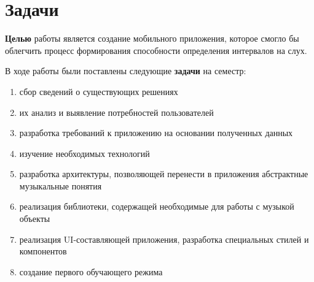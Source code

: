 \titleformat{\chapter}[display]
  {\normalfont\bfseries}{}{0pt}{\Huge}
\chapter{Задачи}

\textbf{Целью} работы является создание мобильного приложения, которое смогло бы облегчить процесс формирования способности определения интервалов на слух. \medskip\par
В ходе работы были поставлены следующие \textbf{задачи} на семестр:
\begin{enumerate}
\item сбор сведений о существующих решениях
\item их анализ и выявление потребностей пользователей
\item разработка требований к приложению на основании полученных данных
\item изучение необходимых технологий
\item разработка архитектуры, позволяющей перенести в приложения абстрактные музыкальные понятия
\item реализация библиотеки, содержащей необходимые для работы с музыкой объекты
\item реализация UI-составляющей приложения, разработка специальных стилей и компонентов
\item создание первого обучающего режима
\end{enumerate}\par